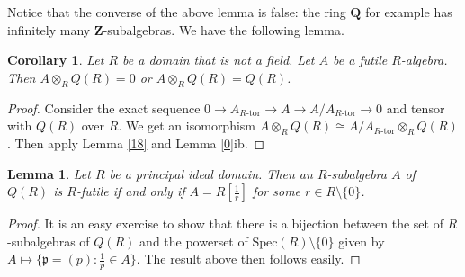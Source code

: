 \documentclass{amsart}
\theoremstyle{plain}
\newtheorem{corollary}[theorem]{Corollary}
\newtheorem{lemma}[theorem]{Lemma}
\theoremstyle{definition}
\begin{document}
Notice that the converse of the above lemma is false: the ring ${\mathbf{Q}}$ for example has infinitely many ${\mathbf{Z}}$-subalgebras. We have the following lemma.

\begin{corollary}
 Let $R$ be a domain that is not a field. Let $A$ be a futile $R$-algebra. Then $A \otimes_R Q(R)=0$ or $A \otimes_R Q(R)=Q(R)$. 
\end{corollary}
\begin{proof}
 Consider the exact sequence $0 \to A_{R\textrm{-tor}} \to A \to A/A_{R\textrm{-tor}} \to 0$ and tensor with $Q(R)$ over $R$. We get an isomorphism
$A
\otimes_R Q(R) \cong A/A_{R\textrm{-tor}} \otimes_R Q(R)$. Then apply Lemma \ref{18} and Lemma \ref{0}ib. 
\end{proof}

\begin{lemma} \label{19}
Let $R$ be a principal ideal domain. Then an $R$-subalgebra $A$ of $Q(R)$ is $R$-futile if and only if $A=R[\frac{1}{r}]$ for some
$r \in R \setminus \{0\}$. 
\end{lemma}
\begin{proof}
It is an easy exercise to show that there is a bijection between the set of $R$-subalgebras of $Q(R)$ and the powerset of $\mathrm{Spec}(R) \setminus \{0\}$ given by $A \mapsto  \{ {\mathfrak{p}}=(p): \frac{1}{p} \in A\}$. The result above then
follows easily. 
\end{proof}
\end{document}
